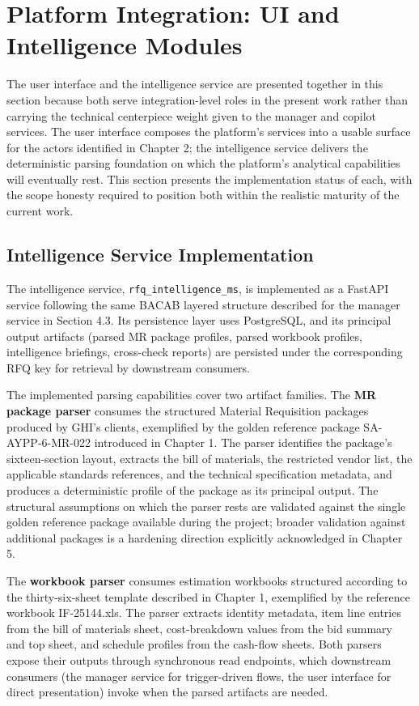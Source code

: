 \section{Platform Integration: UI and Intelligence Modules}
The user interface and the intelligence service are presented together in this section because both serve integration-level roles in the present work rather than carrying the technical centerpiece weight given to the manager and copilot services. The user interface composes the platform's services into a usable surface for the actors identified in Chapter 2; the intelligence service delivers the deterministic parsing foundation on which the platform's analytical capabilities will eventually rest. This section presents the implementation status of each, with the scope honesty required to position both within the realistic maturity of the current work.

\subsection*{Intelligence Service Implementation}
The intelligence service, \texttt{rfq\_intelligence\_ms}, is implemented as a FastAPI service following the same BACAB layered structure described for the manager service in Section 4.3. Its persistence layer uses PostgreSQL, and its principal output artifacts (parsed MR package profiles, parsed workbook profiles, intelligence briefings, cross-check reports) are persisted under the corresponding RFQ key for retrieval by downstream consumers.

The implemented parsing capabilities cover two artifact families. The \textbf{MR package parser} consumes the structured Material Requisition packages produced by GHI's clients, exemplified by the golden reference package SA-AYPP-6-MR-022 introduced in Chapter 1. The parser identifies the package's sixteen-section layout, extracts the bill of materials, the restricted vendor list, the applicable standards references, and the technical specification metadata, and produces a deterministic profile of the package as its principal output. The structural assumptions on which the parser rests are validated against the single golden reference package available during the project; broader validation against additional packages is a hardening direction explicitly acknowledged in Chapter 5.

The \textbf{workbook parser} consumes estimation workbooks structured according to the thirty-six-sheet template described in Chapter 1, exemplified by the reference workbook IF-25144.xls. The parser extracts identity metadata, item line entries from the bill of materials sheet, cost-breakdown values from the bid summary and top sheet, and schedule profiles from the cash-flow sheets. Both parsers expose their outputs through synchronous read endpoints, which downstream consumers (the manager service for trigger-driven flows, the user interface for direct presentation) invoke when the parsed artifacts are needed.

